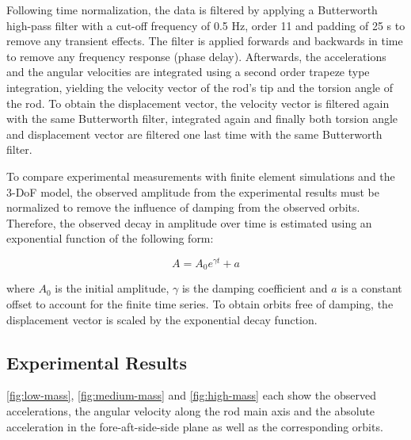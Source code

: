 \documentclass{article}
\begin{document}
Following time normalization, the data is filtered by applying a Butterworth high-pass filter with a cut-off frequency of 0.5 Hz, order 11 and padding of 25 s to remove any transient effects. The filter is applied forwards and backwards in time to remove any frequency response (phase delay). Afterwards, the accelerations and the angular velocities are integrated using a second order trapeze type integration, yielding the velocity vector of the rod's tip and the torsion angle of the rod. To obtain the displacement vector, the velocity vector is filtered again with the same Butterworth filter, integrated again and finally both torsion angle and displacement vector are filtered one last time with the same Butterworth filter.

To compare experimental measurements with finite element simulations and the 3-DoF model, the observed amplitude from the experimental results must be normalized to remove the influence of damping from the observed orbits. Therefore, the observed decay in amplitude over time is estimated using an exponential function of the following form:

\begin{equation}
    A = A_0 e ^ {\gamma t} + a
\end{equation}

where $A_0$ is the initial amplitude, $\gamma$ is the damping coefficient and $a$ is a constant offset to account for the finite time series. To obtain orbits free of damping, the displacement vector is scaled by the exponential decay function. 

\subsection{Experimental Results}

\autoref{fig:low-mass}, \autoref{fig:medium-mass} and \autoref{fig:high-mass} each show the observed accelerations, the angular velocity along the rod main axis and the absolute acceleration in the fore-aft-side-side plane as well as the corresponding orbits.

\end{document}
